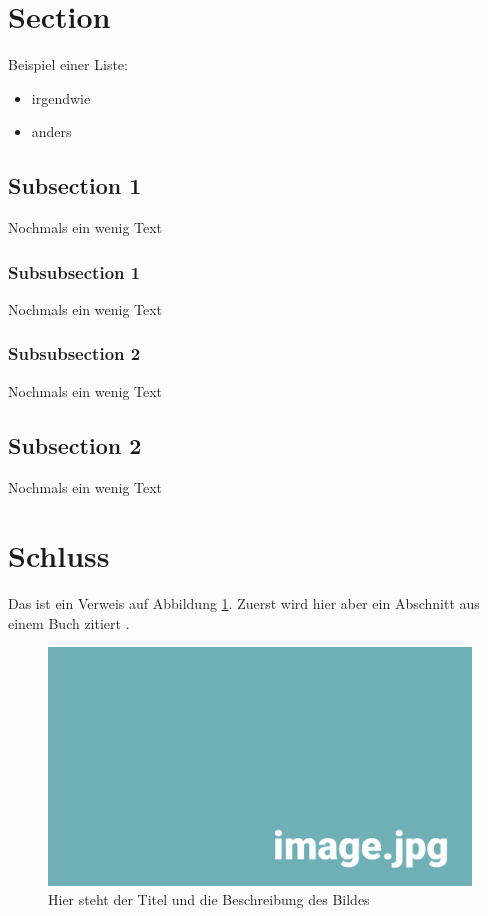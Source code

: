 
\section{Section}

Beispiel einer Liste:

\begin{itemize} 
	\item irgendwie 
	\item anders
\end{itemize}


\subsection{Subsection 1}
Nochmals ein wenig Text

\subsubsection{Subsubsection 1}
Nochmals ein wenig Text

\subsubsection{Subsubsection 2}
Nochmals ein wenig Text

\subsection{Subsection 2}
Nochmals ein wenig Text

\section{Schluss}

Das ist ein Verweis auf Abbildung \ref{pic:DasBild}. Zuerst wird hier aber ein Abschnitt aus einem Buch  zitiert \parencite[S. 42--66]{plato_staat_2017}. \\

\begin{figure}[h!]
	\centering

	\includegraphics[width=\textwidth]{img/image.jpg}

	\caption[Hier steht der Titel des Bildes]{Hier steht der Titel und die Beschreibung des Bildes}
	\label{pic:DasBild}
\end{figure}
